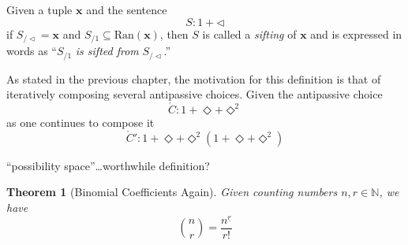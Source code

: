 \documentclass[twoside]{book}
\newcommand{\pass}[1][\Diamond]{\ensuremath{{_{\!/{#1}}}}}
\newcommand{\syntax}[1][\Diamond]{\ensuremath{1+{#1}}}
\newcommand{\syntaxes}[1][\Diamond]{\ensuremath{1+{#1}+{#1}^2}}
\renewcommand{\bold}[1][C]{\ensuremath{{\mathbf #1}}}
\newtheorem{theorem}{Theorem}[section]
\newenvironment{definition}[1][Definition]{\begin{trivlist}
\item[\hskip \labelsep {\bfseries Definition (#1):}]}{\end{trivlist}}
\begin{document}
\begin{definition}[\hypertarget{Permutation}{\hyperlink{oPermutation}{Permutation}}]
\end{definition}

\begin{definition}[\hypertarget{Sifting}{\hyperlink{oSifting}{Sifting}}]

Given a tuple $ \bold[x] $ and the sentence
$$ S:\syntax[\lhd] $$
if $ S\pass[\lhd]=\bold[x] $ and $ S\pass[1]\subseteq\mbox{Ran}(\bold[x]) $,
then $ S $ is called a \emph{sifting} of $ \bold[x] $ and is expressed
in words as ``$ S\pass[1] $ \emph{is sifted from} $ S\pass[\lhd] $.''

\end{definition}

As stated in the previous chapter, the motivation for this definition is that of iteratively
composing several antipassive choices.  Given the antipassive choice
$$ \mathring{C}:\syntaxes $$
as one continues to compose it
$$ \mathring{C}':\syntaxes(\syntaxes) $$

``possibility space''\ldots worthwhile definition?

\begin{theorem}[Binomial Coefficients Again]

Given counting numbers $ n, r\in\mathbb{N} $, we have
$$ {n\choose r}={\frac{n^{\underline{r}}}{r!}} $$

\end{theorem}
\end{document}
